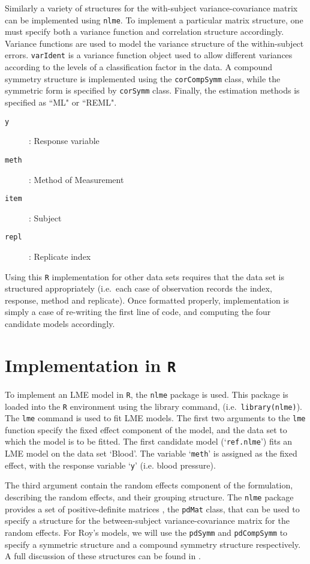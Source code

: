 \documentclass[12pt, a4paper]{report}
\theoremstyle{plain}
\theoremstyle{definition}
\theoremstyle{remark}
\begin{document}
Similarly a variety of structures for the with-subject variance-covariance matrix can be implemented using \texttt{nlme}. To implement a particular matrix structure, one must specify both a variance function and correlation structure accordingly. Variance functions are used to model the variance structure of the within-subject errors. \texttt{varIdent} is a variance function object used to allow different variances according to the levels of a classification factor in the data. A compound symmetry structure is implemented using the \texttt{corCompSymm} class, while the symmetric form is specified by \texttt{corSymm} class. Finally, the estimation methods is specified as ``ML" or ``REML".

\begin{framed}
\begin{description}
\item[\texttt{y}] : Response variable
\item[\texttt{meth}] : Method of Measurement
\item[\texttt{item}] : Subject
\item[\texttt{repl}] : Replicate index
\end{description}
\end{framed}

Using this \texttt{R} implementation for other data sets requires that the data set is structured appropriately (i.e.\ each case of observation records the index, response, method and replicate). Once formatted properly, implementation is simply a case of re-writing the first line of code, and computing the four candidate models accordingly.

\section{Implementation in \texttt{R}}
To implement an LME model in \texttt{R}, the \texttt{nlme} package is used. This package is loaded into the \texttt{R} environment using the library command, (i.e.\ \texttt{library(nlme)}). The \texttt{lme} command is used to fit LME models. The first two arguments to the \texttt{lme} function specify the fixed effect component of the model, and the data set to which the model is to be fitted. The first candidate model (`\texttt{ref.nlme}') fits an LME model on the data set `Blood'. The variable `\texttt{meth}' is assigned as the fixed effect, with the response variable `\texttt{y}' (i.e. blood pressure).

The third argument contain the random effects component of the formulation, describing the random effects, and their grouping structure. The \texttt{nlme} package provides a set of positive-definite matrices , the \texttt{pdMat} class, that can be used to specify a structure for the between-subject variance-covariance matrix for the random effects. For Roy's models, we will use the \texttt{pdSymm} and \texttt{pdCompSymm} to specify a symmetric structure and a compound symmetry structure respectively. A full discussion of these structures can be found in \citet[pg. 158]{PB}.
\end{document}
